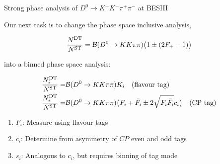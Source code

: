\documentclass{beamer}
\begin{document}
\begin{frame}{Strong phase analysis of $D^0\to K^+K^-\pi^+\pi^-$ at BESIII}
  \begin{center}
    Our next task is to change the phase space inclusive analysis,
  \end{center}
  \begin{equation*}
    \frac{N^{\rm DT}}{N^{\rm ST}} = \mathcal{B}(D^0\to KK\pi\pi)\big(1\pm(2F_+ - 1)\big)
  \end{equation*}
  \begin{center}
    into a binned phase space analysis:
  \end{center}
  \vspace{-0.2cm}
  \begin{align*}
    \frac{N^{\rm DT}_i}{N^{\rm ST}} =& \mathcal{B}(D^0\to KK\pi\pi)K_i\quad\textnormal{(flavour tag)} \\
    \frac{N^{\rm DT}_i}{N^{\rm ST}} =& \mathcal{B}(D^0\to KK\pi\pi)\big(F_i + \bar{F_i} \pm 2\sqrt{F_i\bar{F_i}}c_i\big)\quad\textnormal{(CP tag)}
  \end{align*}
  \vspace{-0.2cm}
  \begin{enumerate}
    \item{$F_i$: Measure using flavour tags}
    \item{$c_i$: Determine from asymmetry of $C\!P$ even and odd tags}
    \item{$s_i$: Analogous to $c_i$, but requires binning of tag mode}
  \end{enumerate}
  \vspace{-7.0cm}
  \begin{center}
  \end{center}
\end{frame}
\end{document}
